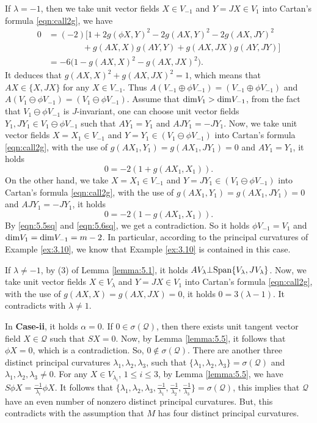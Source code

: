 \documentclass[reqno]{amsart}%
\theoremstyle{definition}
\numberwithin{equation}{section}
\begin{document}
If $\lambda=-1$, then we take unit vector fields $X\in V_{-1}$ and $Y=JX\in V_1$ into Cartan's formula \eqref{eqn:call2g}, we have
$$
\begin{aligned}
0&=(-2)\Big[1+2g(\phi X,Y)^2-2g(AX,Y)^2-2g(AX,JY)^2\\
&\qquad\qquad +g(AX,X)g(AY,Y)+g(AX,JX)g(AY,JY)\Big]\\
&=-6\Big(1-g(AX,X)^2-g(AX,JX)^2\Big).
\end{aligned}
$$
It deduces that $g(AX,X)^2+g(AX,JX)^2=1$, which means that $AX\in\{X,JX\}$ for any $X\in V_{-1}$.
Thus $A(V_{-1}\oplus\phi V_{-1})=(V_{-1}\oplus\phi V_{-1})$
and $A(V_1\ominus \phi V_{-1})=(V_1\ominus \phi V_{-1})$.
Assume that ${\rm dim}V_1>{\rm dim}V_{-1}$, from the fact that
$V_1\ominus \phi V_{-1}$ is $J$-invariant, one can choose unit vector fields
$Y_1,JY_1\in V_1\ominus \phi V_{-1}$ such that $AY_1=Y_1$ and $AJY_1=-JY_1$.
Now, we take unit vector fields $X=X_1\in V_{-1}$ and $Y=Y_1\in (V_1\ominus \phi V_{-1})$
into Cartan's formula \eqref{eqn:call2g}, with the use of $g(AX_1,Y_1)=g(AX_1,JY_1)=0$ and
$AY_1=Y_1$, it holds
\begin{equation}\label{eqn:5.5sq}
0=-2(1+g(AX_1,X_1)).
\end{equation}
On the other hand, we take $X=X_1\in V_{-1}$ and $Y=JY_1\in (V_1\ominus \phi V_{-1})$ into Cartan's formula \eqref{eqn:call2g}, with the use of $g(AX_1,Y_1)=g(AX_1,JY_1)=0$ and
$AJY_1=-JY_1$, it holds
\begin{equation}\label{eqn:5.6sq}
0=-2(1-g(AX_1,X_1)).
\end{equation}
By \eqref{eqn:5.5sq} and \eqref{eqn:5.6sq}, we get a contradiction. So it holds
$\phi V_{-1}=V_1$ and ${\rm dim}V_1={\rm dim}V_{-1}=m-2$.
In particular, according to the principal curvatures of
Example \ref{ex:3.10}, we know that Example \ref{ex:3.10} is contained in this case.

If $\lambda\neq-1$, by (3) of Lemma \ref{lemma:5.1}, it holds
$AV_\lambda\bot {\rm Span}\{V_\lambda, JV_\lambda\}$.
Now, we take unit vector fields $X\in V_\lambda$ and $Y=JX\in V_1$ into Cartan's formula \eqref{eqn:call2g}, with the use of $g(AX,X)=g(AX,JX)=0$, it holds
$0=3(\lambda-1)$. It contradicts with $\lambda\neq1$.

In {\bf Case-ii}, it holds $\alpha=0$. If $0\in\sigma(\mathcal{Q})$, then there exists unit tangent vector field $X\in\mathcal{Q}$ such that $SX=0$. Now, by Lemma \ref{lemma:5.5}, it follows that $\phi X=0$, which is a contradiction. So, $0\notin\sigma(\mathcal{Q})$.
There are another three distinct principal curvatures $\lambda_1,\lambda_2,\lambda_3$,
such that $\{\lambda_1,\lambda_2,\lambda_3\}=\sigma(\mathcal{Q})$ and
$\lambda_1,\lambda_2,\lambda_3\neq0$. For any $X\in V_{\lambda_i}$, $1\leq i\leq3$,
by Lemma \ref{lemma:5.5}, we have $S\phi X=\frac{-1}{\lambda_i}\phi X$.
It follows that
$\{\lambda_1,\lambda_2,\lambda_3,\frac{-1}{\lambda_1},\frac{-1}{\lambda_2},
\frac{-1}{\lambda_3}\}=\sigma(\mathcal{Q})$,
this implies that $\mathcal{Q}$ have an even number of nonzero distinct principal curvatures.
But, this contradicts with
the assumption that $M$ has four distinct principal curvatures.
\end{document}
